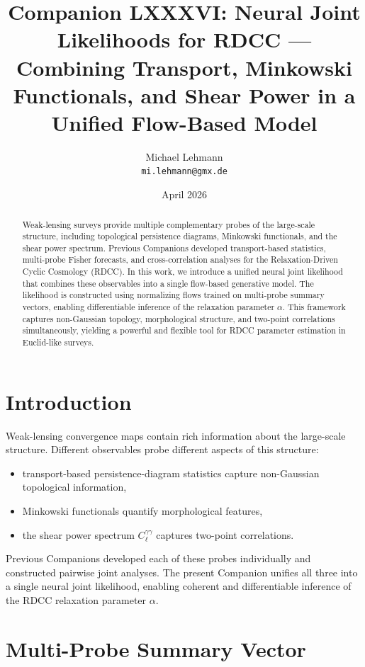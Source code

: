 \documentclass[11pt,a4paper]{article}
\title{\textbf{Companion LXXXVI: Neural Joint Likelihoods for RDCC — Combining Transport, Minkowski Functionals, and Shear Power in a Unified Flow-Based Model}}
\author{Michael Lehmann \\ \texttt{mi.lehmann@gmx.de}}
\date{April 2026}
\begin{document}
\maketitle

\begin{abstract}
Weak-lensing surveys provide multiple complementary probes of the large-scale 
structure, including topological persistence diagrams, Minkowski functionals, and 
the shear power spectrum. Previous Companions developed transport-based 
statistics, multi-probe Fisher forecasts, and cross-correlation analyses for the 
Relaxation-Driven Cyclic Cosmology (RDCC). In this work, we introduce a unified 
neural joint likelihood that combines these observables into a single 
flow-based generative model. The likelihood is constructed using normalizing 
flows trained on multi-probe summary vectors, enabling differentiable inference 
of the relaxation parameter $\alpha$. This framework captures non-Gaussian 
topology, morphological structure, and two-point correlations simultaneously, 
yielding a powerful and flexible tool for RDCC parameter estimation in 
Euclid-like surveys.
\end{abstract}
\section{Introduction}

Weak-lensing convergence maps contain rich information about the large-scale 
structure. Different observables probe different aspects of this structure:

\begin{itemize}
    \item transport-based persistence-diagram statistics capture non-Gaussian 
          topological information,
    \item Minkowski functionals quantify morphological features,
    \item the shear power spectrum $C_\ell^{\gamma\gamma}$ captures two-point 
          correlations.
\end{itemize}

Previous Companions developed each of these probes individually and constructed 
pairwise joint analyses. The present Companion unifies all three into a single 
neural joint likelihood, enabling coherent and differentiable inference of the 
RDCC relaxation parameter $\alpha$.
\section{Multi-Probe Summary Vector}
\end{document}
